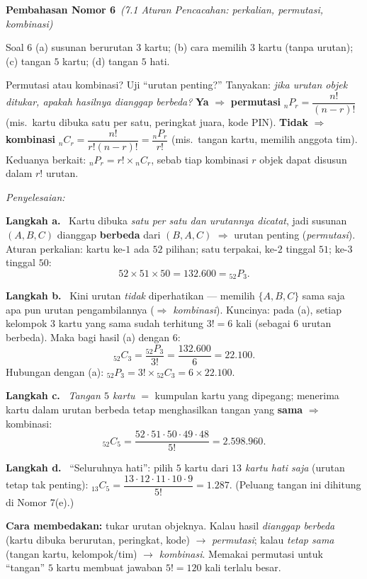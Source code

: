 \documentclass[11pt,a4paper]{article}
\newcommand{\jawab}{\par\smallskip\noindent\textit{\textcolor{oranye}{Penyelesaian:}}\par\smallskip}
\newcommand{\langkah}[1]{\par\smallskip\noindent\textbf{\textcolor{biru}{Langkah #1.}}\ }
\newcommand{\nomorjudul}[2]{\par\bigskip\noindent%
  {\large\bfseries\color{ungu}Pembahasan Nomor #1}\ {\normalfont\itshape\color{gray}(#2)}\par\nopagebreak\smallskip}
\begin{document}
\nomorjudul{6}{7.1 Aturan Pencacahan: perkalian, permutasi, kombinasi}
\begin{soalbox}{Soal 6}
(a) susunan berurutan $3$ kartu; (b) cara memilih $3$ kartu (tanpa urutan);
(c) tangan $5$ kartu; (d) tangan $5$ hati.
\end{soalbox}

\begin{ingat}{Permutasi atau kombinasi? Uji ``urutan penting?''}
Tanyakan: \emph{jika urutan objek ditukar, apakah hasilnya dianggap berbeda?}
\textbf{Ya} $\Rightarrow$ \textbf{permutasi} $_nP_r=\dfrac{n!}{(n-r)!}$ (mis.\ kartu
dibuka satu per satu, peringkat juara, kode PIN). \textbf{Tidak} $\Rightarrow$
\textbf{kombinasi} $_nC_r=\dfrac{n!}{r!(n-r)!}=\dfrac{_nP_r}{r!}$ (mis.\ tangan
kartu, memilih anggota tim). Keduanya berkait: $_nP_r=r!\times{}_nC_r$, sebab tiap
kombinasi $r$ objek dapat disusun dalam $r!$ urutan.
\end{ingat}

\jawab
\langkah{a} Kartu dibuka \emph{satu per satu dan urutannya dicatat}, jadi susunan
$(A,B,C)$ dianggap \textbf{berbeda} dari $(B,A,C)$ $\Rightarrow$ urutan penting
(\emph{permutasi}). Aturan perkalian: kartu ke-$1$ ada $52$ pilihan; satu terpakai,
ke-$2$ tinggal $51$; ke-$3$ tinggal $50$:
\[
52\times51\times50=132.600={}_{52}P_{3}.
\]

\langkah{b} Kini urutan \emph{tidak} diperhatikan --- memilih $\{A,B,C\}$ sama saja
apa pun urutan pengambilannya ($\Rightarrow$ \emph{kombinasi}). Kuncinya: pada (a),
setiap kelompok $3$ kartu yang sama sudah terhitung $3!=6$ kali (sebagai $6$ urutan
berbeda). Maka bagi hasil (a) dengan $6$:
\[
{}_{52}C_{3}=\frac{{}_{52}P_{3}}{3!}=\frac{132.600}{6}=\mathbf{22.100}.
\]
Hubungan dengan (a): ${}_{52}P_3=3!\times{}_{52}C_3=6\times22.100$.

\langkah{c} \emph{Tangan $5$ kartu} $=$ kumpulan kartu yang dipegang; menerima kartu
dalam urutan berbeda tetap menghasilkan tangan yang \textbf{sama} $\Rightarrow$
kombinasi:
\[
{}_{52}C_{5}=\frac{52\cdot51\cdot50\cdot49\cdot48}{5!}=\mathbf{2.598.960}.
\]

\langkah{d} ``Seluruhnya hati'': pilih $5$ kartu dari \emph{$13$ kartu hati saja}
(urutan tetap tak penting): ${}_{13}C_{5}=\dfrac{13\cdot12\cdot11\cdot10\cdot9}{5!}
=\mathbf{1.287}$. (Peluang tangan ini dihitung di Nomor 7(e).)

\begin{jebakan}
\textbf{Cara membedakan:} tukar urutan objeknya. Kalau hasil \emph{dianggap berbeda}
(kartu dibuka berurutan, peringkat, kode) $\to$ \emph{permutasi}; kalau \emph{tetap
sama} (tangan kartu, kelompok/tim) $\to$ \emph{kombinasi}. Memakai permutasi untuk
``tangan'' $5$ kartu membuat jawaban $5!=120$ kali terlalu besar.
\end{jebakan}
\end{document}
